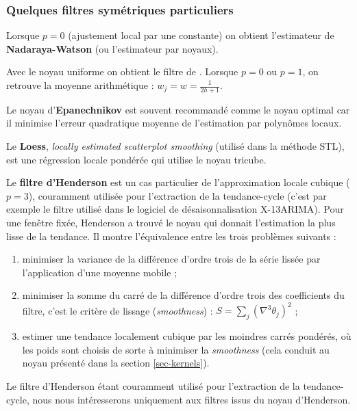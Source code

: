 \documentclass[
  12pt,
  french,
  12pt,a4paper]{article}
\providecommand{\tightlist}{%
  \setlength{\itemsep}{0pt}\setlength{\parskip}{0pt}}
\newcommand\1{\mathds{1}}
\begin{document}
\hypertarget{sec-sympolyfilter}{%
\subsubsection{Quelques filtres symétriques particuliers}\label{sec-sympolyfilter}}

Lorsque \(p=0\) (ajustement local par une constante) on obtient l'estimateur de \textbf{Nadaraya-Watson} (ou l'estimateur par noyaux).

Avec le noyau uniforme on obtient le filtre de \textcite{macaulay1931smoothing}.
Lorsque \(p=0\) ou \(p=1\), on retrouve la moyenne arithmétique : \(w_j=w=\frac{1}{2h+1}\).

Le noyau d'\textbf{Epanechnikov} est souvent recommandé comme le noyau optimal car il minimise l'erreur quadratique moyenne de l'estimation par polynômes locaux.

Le \textbf{Loess}, \emph{locally estimated scatterplot smoothing} (utilisé dans la méthode STL), est une régression locale pondérée qui utilise le noyau tricube.

Le \textbf{filtre d'Henderson} est un cas particulier de l'approximation locale cubique (\(p=3\)), couramment utilisée pour l'extraction de la tendance-cycle (c'est par exemple le filtre utilisé dans le logiciel de désaisonnalisation X-13ARIMA).
Pour une fenêtre fixée, Henderson a trouvé le noyau qui donnait l'estimation la plus lisse de la tendance.
Il montre l'équivalence entre les trois problèmes suivants :

\begin{enumerate}
\def\labelenumi{\arabic{enumi}.}
\tightlist
\item
  minimiser la variance de la différence d'ordre trois de la série lissée par l'application d'une moyenne mobile ;\\
\item
  minimiser la somme du carré de la différence d'ordre trois des coefficients du filtre, c'est le critère de lissage (\emph{smoothness}) : \(S=\sum_j(\nabla^{3}\theta_{j})^{2}\) ;\\
\item
  estimer une tendance localement cubique par les moindres carrés pondérés, où les poids sont choisis de sorte à minimiser la \emph{smoothness} (cela conduit au noyau présenté dans la section \ref{sec-kernels}).
\end{enumerate}

Le filtre d'Henderson étant couramment utilisé pour l'extraction de la tendance-cycle, nous nous intéresserons uniquement aux filtres issus du noyau d'Henderson.
\end{document}
